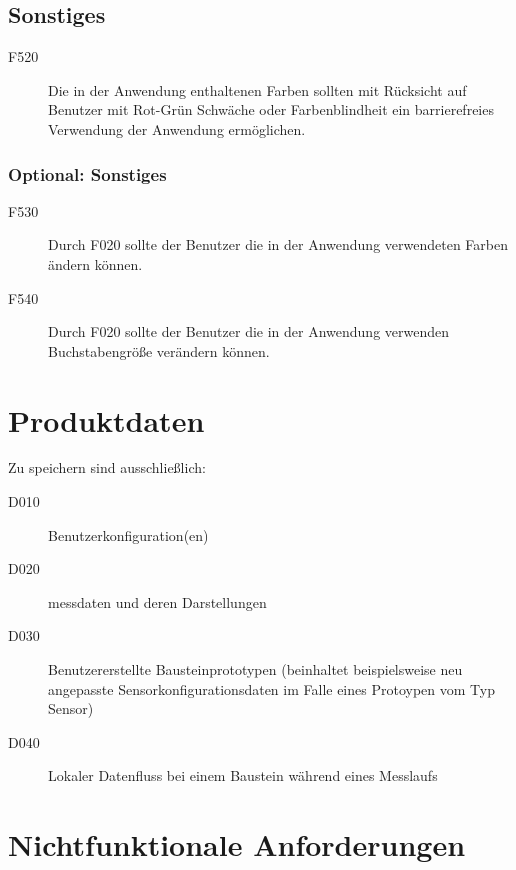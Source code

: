 \documentclass[parskip=full]{scrartcl}
\begin{document}
\subsection{Sonstiges}

\begin{description}

\item[F520] Die in der Anwendung enthaltenen Farben sollten mit Rücksicht auf Benutzer mit Rot-Grün Schwäche oder Farbenblindheit ein barrierefreies Verwendung der Anwendung ermöglichen.

\end{description}

\subsubsection{Optional: Sonstiges}

\begin{description}

\item[F530] Durch F020 sollte der Benutzer die in der Anwendung verwendeten Farben ändern können.
\item[F540] Durch F020 sollte der Benutzer die in der Anwendung verwenden Buchstabengröße verändern können.

\end{description}

\clearpage
\section{Produktdaten}\label{produktdaten}

Zu speichern sind ausschließlich:

\begin{description}

\item[D010] \gls{Benutzerkonfiguration}(en)
\item[D020] \gls{messdaten} und deren Darstellungen
\item[D030] Benutzererstellte Bausteinprototypen (beinhaltet beispielsweise neu angepasste Sensorkonfigurationsdaten im Falle eines Protoypen vom Typ Sensor)
\item[D040] Lokaler Datenfluss bei einem Baustein während eines Messlaufs 

\end{description}

\clearpage
\section{Nichtfunktionale Anforderungen}\label{nichtfunktionale}
\end{document}
